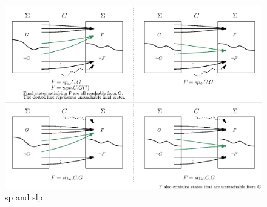 \begin{figure}[ht!]\centering
\includegraphics[width=\textwidth]{image/sp-slp.eps}
\caption{sp and slp}
\label{fig:sp-slp}
\end{figure}



